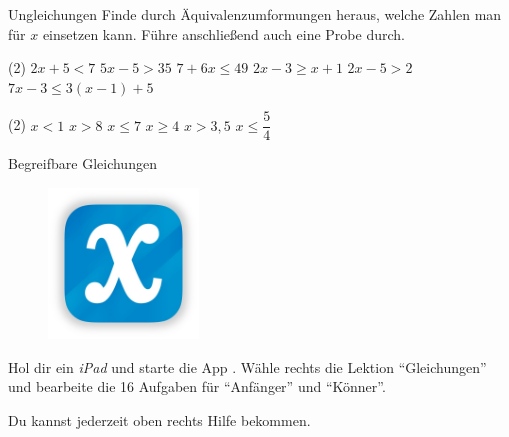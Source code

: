 \documentclass[12pt,a5paper,landscape]{scrartcl}
\begin{document}
\begin{karte2}{Ungleichungen}
	Finde durch Äquivalenzumformungen heraus, welche Zahlen man für $x$ einsetzen kann. Führe anschließend auch eine Probe durch.
	
	\begin{tasks}(2)
		\task $2x + 5 < 7$
		\task $5x - 5 > 35$
		\task $7 + 6x \leq 49$
		\task $2x - 3 \geq x + 1$
		\task $2x - 5 > 2$
		\task $7x - 3 \leq 3(x-1) + 5$
	\end{tasks}
\end{karte2}

\begin{loesungskarte}
	\begin{tasks}(2)
		\task $x < 1$
		\task $x > 8$
		\task $x \leq 7$
		\task $x \geq 4$
		\task $x > 3,5$
		\task $x \leq \dfrac{5}{4}$
	\end{tasks}
\end{loesungskarte}

\begin{karte1}[\symHandy]{Begreifbare Gleichungen}
\vspace*{2cm}
\begin{wrapfig}
	\begin{figure}
	\includegraphics[width=4cm]{7.4-LT-Abb_Algebra Touch}
	\end{figure}
	Hol dir ein \emph{iPad} und starte die App . Wähle rechts die Lektion \enquote{Gleichungen} und bearbeite die 16 Aufgaben für \enquote{Anfänger} und \enquote{Könner}.

	
	Du kannst jederzeit oben rechts Hilfe bekommen.
\end{wrapfig}
\end{karte1}

\leereKarte
\end{document}
